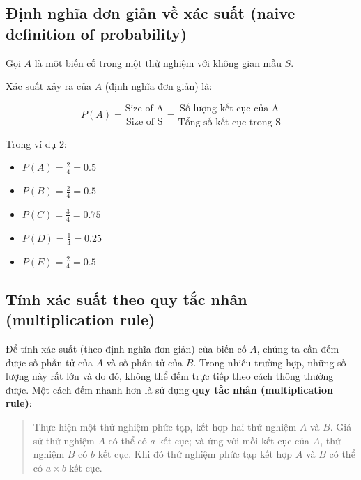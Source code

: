 \documentclass[
]{book}
\providecommand{\tightlist}{%
  \setlength{\itemsep}{0pt}\setlength{\parskip}{0pt}}
\begin{document}
\hypertarget{ux111ux1ecbnh-nghux129a-ux111ux1a1n-giux1ea3n-vux1ec1-xuxe1c-suux1ea5t-naive-definition-of-probability}{%
\subsection{Định nghĩa đơn giản về xác suất (naive definition of probability)}\label{ux111ux1ecbnh-nghux129a-ux111ux1a1n-giux1ea3n-vux1ec1-xuxe1c-suux1ea5t-naive-definition-of-probability}}

Gọi \(A\) là một biến cố trong một thử nghiệm với không gian mẫu \(S\).

Xác suất xảy ra của \(A\) (định nghĩa đơn giản) là:

\[
P(A) = \frac{\text{Size of A}}{\text{Size of S}} = \frac{\text{Số lượng kết cục của A}}{\text{Tổng số kết cục trong S}}
\]

Trong ví dụ 2:

\begin{itemize}
\tightlist
\item
  \(P(A) = \frac{2}{4} = 0.5\)
\item
  \(P(B) = \frac{2}{4} = 0.5\)
\item
  \(P(C) = \frac{3}{4} = 0.75\)
\item
  \(P(D) = \frac{1}{4} = 0.25\)
\item
  \(P(E) = \frac{2}{4} = 0.5\)
\end{itemize}

\hypertarget{tuxednh-xuxe1c-suux1ea5t-theo-quy-tux1eafc-nhuxe2n-multiplication-rule}{%
\subsection{Tính xác suất theo quy tắc nhân (multiplication rule)}\label{tuxednh-xuxe1c-suux1ea5t-theo-quy-tux1eafc-nhuxe2n-multiplication-rule}}

Để tính xác suất (theo định nghĩa đơn giản) của biến cố \(A\), chúng ta cần đếm được số phần tử của \(A\) và số phần tử của \(B\). Trong nhiều trường hợp, những số lượng này rất lớn và do đó, không thể đếm trực tiếp theo cách thông thường được. Một cách đếm nhanh hơn là sử dụng \textbf{quy tắc nhân (multiplication rule)}:

\begin{quote}
Thực hiện một thử nghiệm phức tạp, kết hợp hai thử nghiệm \(A\) và \(B\). Giả sử thử nghiệm \(A\) có thể có \(a\) kết cục; và ứng với mỗi kết cục của \(A\), thử nghiệm \(B\) có \(b\) kết cục. Khi đó thử nghiệm phức tạp kết hợp \(A\) và \(B\) có thể có \(a \times b\) kết cục.
\end{quote}
\end{document}
